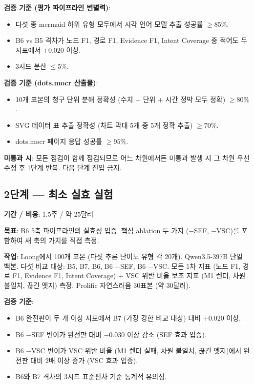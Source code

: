 \documentclass[11pt]{article}
\begin{document}
\textbf{검증 기준 (평가 파이프라인 변별력)}:
\begin{itemize}[leftmargin=*]
    \item 다섯 종 mermaid 하위 유형 모두에서 시각 언어 모델 추출 성공률 $\geq 85\%$.
    \item B6 vs B5 격차가 노드 F1, 경로 F1, Evidence F1, Intent Coverage 중 적어도 두 지표에서 $+0.020$ 이상.
    \item 3시드 분산 $\leq 5\%$.
\end{itemize}

\textbf{검증 기준 (dots.mocr 산출물)}:
\begin{itemize}[leftmargin=*]
    \item 10개 표본의 청구 단위 분해 정확성 (수치 + 단위 + 시간 정박 모두 정확) $\geq 80\%$.
    \item SVG 데이터 표 추출 정확성 (차트 막대 5개 중 5개 정확 추출) $\geq 70\%$.
    \item dots.mocr 페이지 응답 성공률 $\geq 95\%$.
\end{itemize}

\textbf{미통과 시}: 모든 점검이 함께 점검되므로 어느 차원에서든 미통과 발생 시 그 차원 우선 수정 후 1단계 반복. 다음 단계 진입 금지.

\subsection{2단계 — 최소 실효 실험}

\textbf{기간 / 비용}: 1.5주 / 약 25달러

\textbf{목표}: B6 5축 파이프라인의 실효성 입증. 핵심 ablation 두 가지 (−SEF, −VSC)를 포함하여 새 축의 가치를 직접 측정.

\textbf{작업}: Loong에서 100개 표본 (다섯 추론 난이도 유형 각 20개). Qwen3.5-397B 단일 백본. 다섯 비교 대상: B5, B7, B6, B6 −SEF, B6 −VSC. 모든 1차 지표 (노드 F1, 경로 F1, Evidence F1, Intent Coverage) + VSC 위반 비율 보조 지표 (M1 렌더, 차원 불일치, 끊긴 엣지) 측정. Prolific 자연스러움 30표본 (약 30달러).

\textbf{검증 기준}:
\begin{itemize}[leftmargin=*]
    \item B6 완전판이 두 개 이상 지표에서 B7 (가장 강한 비교 대상) 대비 $+0.020$ 이상.
    \item B6 −SEF 변이가 완전판 대비 $-0.030$ 이상 감소 (SEF 효과 입증).
    \item B6 −VSC 변이가 VSC 위반 비율 (M1 렌더 실패, 차원 불일치, 끊긴 엣지)에서 완전판 대비 2배 이상 증가 (VSC 효과 입증).
    \item B6와 B7 격차의 3시드 표준편차 기준 통계적 유의성.
\end{itemize}
\end{document}
